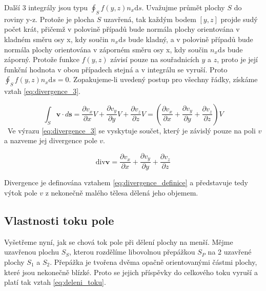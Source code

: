 \documentclass{book}
\newcommand{\vect}[1]{\boldsymbol{#1}}
\newcommand{\diverg}{\mathrm{div}}
\begin{document}
Další 3 integrály jsou typu \(\oint_S f(y, z) n_x \mathrm{d}s\). Uvažujme průmět plochy \(S\) do roviny y-z. Protože je plocha \(S\) uzavřená, tak každým bodem \([y, z]\) projde sudý počet krát, přičemž v polovině případů bude normála plochy orientována v kladném směru osy x, kdy součin \(n_x \mathrm{d}s\) bude kladný, a v polovině případů bude normála plochy orientována v záporném směru osy x, kdy součin \(n_x \mathrm{d}s\) bude záporný. Protože funkce \(f(y, z)\) závisí pouze na souřadnicích \(y\) a \(z\), proto je její funkční hodnota v obou případech stejná a v integrálu se vyruší. Proto \(\oint_S f(y, z) n_x \mathrm{d}s = 0\). Zopakujeme-li uvedený postup pro všechny řádky, získáme vztah \eqref{eq:divergence_3}.

\begin{equation}
\label{eq:divergence_3}
\int_S \vect{v} \cdot d\vect{s} = \frac{\partial v_x}{\partial x} V + \frac{\partial v_y}{\partial y} V + \frac{\partial v_z}{\partial z} V = \left(\frac{\partial v_x}{\partial x} + \frac{\partial v_y}{\partial y} + \frac{\partial v_z}{\partial z}\right) V
\end{equation}
\
Ve výrazu \eqref{eq:divergence_3} se vyskytuje součet, který je závislý pouze na poli \(v\) a nazveme jej divergence pole \(v\). 

\begin{equation}
\label{eq:divergence_definice}
\diverg \vect{v} = \frac{\partial v_x}{\partial x} + \frac{\partial v_y}{\partial y} + \frac{\partial v_z}{\partial z}
\end{equation}

Divergence je definována vztahem \eqref{eq:divergence_definice} a představuje tedy výtok pole \(v\) z nekonečně malého tělesa dělená jeho objemem.

\subsection{Vlastnosti toku pole}

Vyšetřeme nyní, jak se chová tok pole při dělení plochy na menší. Mějme uzavřenou plochu \(S_S\), kterou rozdělíme libovolnou přepážkou \(S_P\) na 2 uzavřené plochy \(S_1\) a \(S_2\). Přepážka je tvořena dvěma opačně orientovanými částmi plochy, které jsou nekonečně blízké. Proto se jejich příspěvky do celkového toku vyruší a platí tak vztah \eqref{eq:deleni_toku}.
\end{document}
